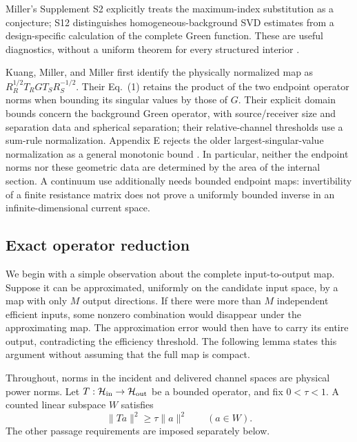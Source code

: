 Miller's Supplement S2 explicitly treats the maximum-index substitution as a
conjecture; S12 distinguishes homogeneous-background SVD estimates from a
design-specific calculation of the complete Green function.  These are useful
diagnostics, without a uniform theorem for every structured interior
\cite[Supplements S2 and S12]{miller2023}.

Kuang, Miller, and Miller first identify the physically normalized map as
$R_R^{1/2}T_RGT_SR_S^{-1/2}$.  Their Eq.~(1) retains the product of the two
endpoint operator norms when bounding its singular values by those of $G$.
Their explicit domain bounds concern the background Green operator, with
source/receiver size and separation data and spherical separation; their
relative-channel thresholds use a sum-rule normalization.  Appendix E rejects
the older largest-singular-value normalization as a general monotonic bound
\cite[Section II and Appendix E]{kuang2025}.  In particular, neither the
endpoint norms nor these geometric data are determined by the area of the
internal section.  A continuum use additionally needs bounded endpoint maps:
invertibility of a finite resistance matrix does not prove a uniformly bounded
inverse in an infinite-dimensional current space.

\subsection{Exact operator reduction}
\label{ch:operators}

We begin with a simple observation about the complete input-to-output map.
Suppose it can be approximated, uniformly on the candidate input space, by a
map with only $M$ output directions.  If there were more than $M$ independent
efficient inputs, some nonzero combination would disappear under the
approximating map.  The approximation error would then have to carry its
entire output, contradicting the efficiency threshold.  The following
lemma states this argument without assuming that the full map is compact.

Throughout, norms in the incident and delivered channel spaces are physical
power norms.  Let $T:\mathcal H_{\rm in}\to\mathcal H_{\rm out}$ be a bounded
operator, and fix $0<\tau<1$.  A counted linear subspace $W$ satisfies
\begin{equation}
 \|Ta\|^2\geq\tau\|a\|^2\qquad(a\in W).
 \label{ch:throughput}
\end{equation}
The other passage requirements are imposed separately below.

